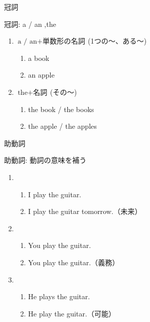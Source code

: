 \documentclass[aspectratio=169,xcolor={dvipsnames,table}]{beamer}
\begin{document}
\begin{frame}[plain]{冠詞}
\Large

冠詞: a / an ,\hspace{10pt}the

 \begin{enumerate}
  \item $\text{a / an} + \text{単数形の名詞}$\,(1つの～、ある～)
	\begin{enumerate}
	 \item a book\hfill\textipa{/\textschwa /}
	 \item an apple\hfill{}
	\end{enumerate}
  \item $\text{the} + \text{名詞}$\,(その～)\hspace{10pt}{\small (単数形・複数形どちらにもつく)}
	\begin{enumerate}
	 \item the book / the books\hfill\textipa{/\dh\textschwa/}
	 \item the apple / the apples\hfill{}
	\end{enumerate}
 \end{enumerate}
\mbox{}\hfill{\scriptsize {}}
\end{frame}
\begin{frame}[plain]{助動詞}
 \Large

助動詞: 動詞の意味を補う

\begin{enumerate}
 \item \begin{enumerate}
	\item<1-> I play the guitar.
	\item<2-> I  play the guitar tomorrow.（未来）
       \end{enumerate}
 \item \begin{enumerate}
	\item<3-> You play the guitar.
	\item<4-> You  play the guitar.（義務）
       \end{enumerate}
 \item \begin{enumerate}
	\item<5-> He plays the guitar.
	\item<6-> He  play the guitar.（可能）
       \end{enumerate}
\end{enumerate}
\mbox{}\hfill{\scriptsize {}}
\end{frame}
\end{document}
